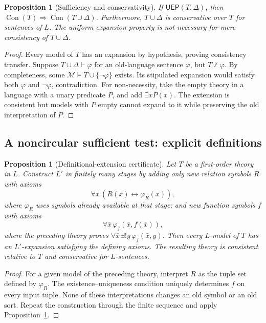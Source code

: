 \documentclass[11pt,letterpaper]{article}
\newtheorem{proposition}[theorem]{Proposition}
\theoremstyle{definition}
\newcommand{\Con}{\operatorname{Con}}
\begin{document}
\begin{proposition}[Sufficiency and conservativity]\label{prop:uep}
If \(\mathsf{UEP}(T,\Delta)\), then \(\Con(T)\Rightarrow\Con(T\cup\Delta)\). Furthermore, \(T\cup\Delta\) is conservative over \(T\) for sentences of \(L\). The uniform expansion property is not necessary for mere consistency of \(T\cup\Delta\).
\end{proposition}
\begin{proof}
Every model of \(T\) has an expansion by hypothesis, proving consistency transfer. Suppose \(T\cup\Delta\vdash\varphi\) for an old-language sentence \(\varphi\), but \(T\not\vdash\varphi\). By completeness, some \(\mathcal M\models T\cup\{\neg\varphi\}\) exists. Its stipulated expansion would satisfy both \(\varphi\) and \(\neg\varphi\), contradiction. For non-necessity, take the empty theory in a language with a unary predicate \(P\), and add \(\exists xP(x)\). The extension is consistent but models with \(P\) empty cannot expand to it while preserving the old interpretation of \(P\).
\end{proof}

\subsection{A noncircular sufficient test: explicit definitions}

\begin{proposition}[Definitional-extension certificate]\label{prop:definitional}
Let $T$ be a first-order theory in $L$. Construct $L'$ in finitely many stages by adding only new relation symbols $R$ with axioms
\[
\forall\bar x\,(R(\bar x)\leftrightarrow\varphi_R(\bar x)),
\]
where $\varphi_R$ uses symbols already available at that stage; and new function symbols $f$ with axioms
\[
\forall\bar x\,\varphi_f(\bar x,f(\bar x)),
\]
where the preceding theory proves $\forall\bar x\,\exists!y\,\varphi_f(\bar x,y)$.
Then every $L$-model of $T$ has an $L'$-expansion satisfying the defining axioms. The resulting theory is consistent relative to $T$ and conservative for $L$-sentences.
\end{proposition}
\begin{proof}
For a given model of the preceding theory, interpret $R$ as the tuple set defined by $\varphi_R$. The existence--uniqueness condition uniquely determines $f$ on every input tuple. None of these interpretations changes an old symbol or an old sort. Repeat the construction through the finite sequence and apply Proposition~\ref{prop:uep}.
\end{proof}
\end{document}
